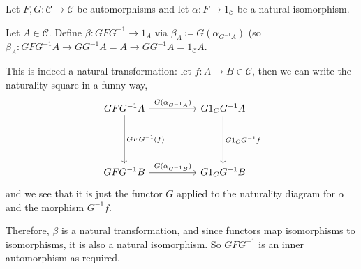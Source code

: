 Let $F, G\colon \mathcal{C}\to \mathcal{C}$ be automorphisms and let
$\alpha\colon F\to 1_{\mathcal{C}}$ be a natural isomorphism.

Let $A \in \mathcal{C}$. Define $\beta\colon GFG^{-1} \to 1_A$ via
$\beta_A\coloneqq G(\alpha_{G^{-1}A})$ (so $\beta_A\colon GFG^{-1}A \to GG^{-1}A = A \to GG^{-1}A = 1_{\mathcal{C}}A$.

This is indeed a natural transformation: let $f\colon A\to B \in \mathcal{C}$,
then we can write the naturality square in a funny way,
\[\begin{tikzcd}[row sep=1.7cm, column sep=1.7cm]
	GFG^{-1}A \ar[r, "G(\alpha_{G^{-1}A})"]\ar[d, "GFG^{-1}(f)"] & G1_CG^{-1}A\ar[d, "G1_CG^{-1}f"]\\
	GFG^{-1}B\ar[r, "G(\alpha_{G^{-1}B})"] & G1_CG^{-1}B
\end{tikzcd}\]
and we see that it is just the functor $G$ applied to the naturality diagram for
$\alpha$ and the morphism $G^{-1}f$.

Therefore, $\beta$ is a natural transformation, and since functors map isomorphisms
to isomorphisms, it is also a natural isomorphism. So $GFG^{-1}$ is an inner
automorphism as required.
